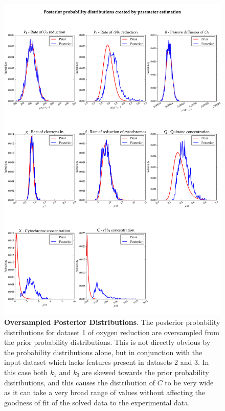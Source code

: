 \begin{figure}[p]
 \centering
 \includegraphics[width=15cm, trim=0cm 0cm 0cm 0cm]{./05-oxygenreduction/data/oversampling_posteriors.pdf}
 \caption[Oversampled Posterior Distributions]{{\bf Oversampled Posterior Distributions}. The posterior probability distributions for dataset 1 of oxygen reduction are oversampled from the prior probability distributions. This is not directly obvious by the probability distributions alone, but in conjunction with the input dataset which lacks features present in datasets 2 and 3. In this case both $k_1$ and $k_3$ are skewed towards the prior probability distributions, and this causes the distribution of $C$ to be very wide as it can take a very broad range of values without affecting the goodness of fit of the solved data to the experimental data.
 \label{fig:dataset1posterior}}
\end{figure}

